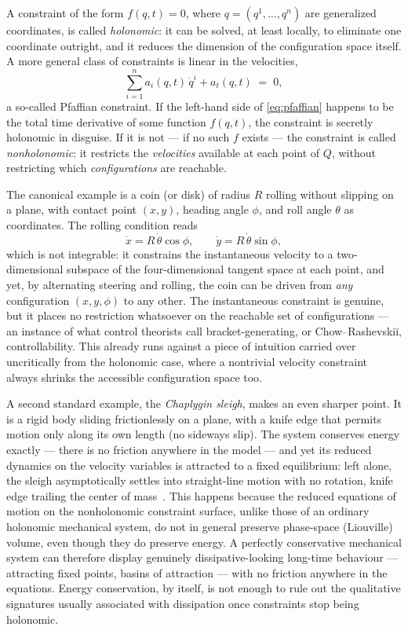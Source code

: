 A constraint of the form $f(q,t)=0$, where $q=(q^1,\dots,q^n)$ are
generalized coordinates, is called \emph{holonomic}: it can be
solved, at least locally, to eliminate one coordinate outright, and
it reduces the dimension of the configuration space itself. A more
general class of constraints is linear in the velocities,
\begin{equation}
  \sum_{i=1}^n a_i(q,t)\,\dot q^i + a_t(q,t) \;=\;0,
  \label{eq:pfaffian}
\end{equation}
a so-called Pfaffian constraint. If the left-hand side of
\eqref{eq:pfaffian} happens to be the total time derivative of some
function $f(q,t)$, the constraint is secretly holonomic in disguise.
If it is not --- if no such $f$ exists --- the constraint is called
\emph{nonholonomic}: it restricts the \emph{velocities} available at
each point of $Q$, without restricting which \emph{configurations}
are reachable.

The canonical example is a coin (or disk) of radius $R$ rolling
without slipping on a plane, with contact point $(x,y)$, heading
angle $\phi$, and roll angle $\theta$ as coordinates. The
rolling condition reads
\begin{equation}
  \dot x = R\,\dot\theta\cos\phi ,\qquad
  \dot y = R\,\dot\theta\sin\phi ,
  \label{eq:rolling-coin}
\end{equation}
which is not integrable: it constrains the instantaneous velocity to
a two-dimensional subspace of the four-dimensional tangent space at
each point, and yet, by alternating steering and rolling, the coin
can be driven from \emph{any} configuration $(x,y,\phi)$ to any
other. The instantaneous constraint is genuine, but it places no
restriction whatsoever on the reachable set of configurations --- an
instance of what control theorists call bracket-generating, or
Chow--Rashevski\u{i}, controllability. This already runs against a
piece of intuition carried over uncritically from the holonomic
case, where a nontrivial velocity constraint always shrinks the
accessible configuration space too.

A second standard example, the \emph{Chaplygin sleigh}, makes an
even sharper point. It is a rigid body sliding frictionlessly on a
plane, with a knife edge that permits motion only along its own
length (no sideways slip). The system conserves energy exactly ---
there is no friction anywhere in the model --- and yet its reduced
dynamics on the velocity variables is attracted to a fixed
equilibrium: left alone, the sleigh asymptotically settles into
straight-line motion with no rotation, knife edge trailing the
center of mass~\cite{Chaplygin1911,ChaplyginSleighWiki}. This
happens because the reduced equations of motion on the nonholonomic
constraint surface, unlike those of an ordinary holonomic mechanical
system, do not in general preserve phase-space (Liouville) volume,
even though they do preserve energy. A perfectly conservative
mechanical system can therefore display genuinely dissipative-looking
long-time behaviour --- attracting fixed points, basins of
attraction --- with no friction anywhere in the equations. Energy
conservation, by itself, is not enough to rule out the qualitative
signatures usually associated with dissipation once constraints stop
being holonomic.

